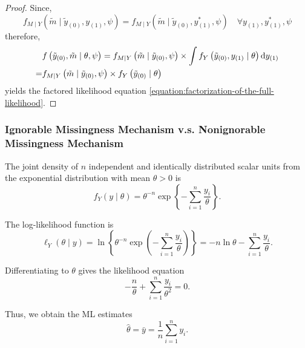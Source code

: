 \begin{proof}
	Since,
	\begin{equation}
		f_{M \mid Y}\left(\tilde{m} \mid \tilde{y}_{(0)}, y_{(1)}, \psi\right)=f_{M \mid Y}\left(\tilde{m} \mid \tilde{y}_{(0)}, y_{(1)}^{*}, \psi\right) \quad \forall y_{(1)}, y_{(1)}^{*}, \psi
	\end{equation}
	therefore,
	\begin{equation}
		\begin{aligned}
			  & f\left(\tilde{y}_{(0)}, \tilde{m} \mid \theta, \psi\right)=f_{M \mid Y}\left(\tilde{m} \mid \tilde{y}_{(0)}, \psi\right) \times \int f_{Y}\left(\tilde{y}_{(0)}, y_{(1)} \mid \theta\right) \mathop{}\!\mathrm{d} y_{(1)} \\
			= & f_{M \mid Y}\left(\tilde{m} \mid \tilde{y}_{(0)}, \psi\right) \times f_{Y}\left(\tilde{y}_{(0)} \mid \theta\right)
		\end{aligned}
	\end{equation}
	yields the factored likelihood equation \ref{equation:factorization-of-the-full-likelihood}.
\end{proof}

\subsubsection{Ignorable Missingness Mechanism v.s. Nonignorable Missingness Mechanism}

\begin{example}
	The joint density of $n$ independent and identically distributed scalar units from the exponential distribution with mean $\theta>0$ is
	\begin{equation}
		f_{Y}(y\mid\theta)=\theta^{-n}\exp\left\{-\sum_{i=1}^{n}\frac{y_{i}}{\theta}\right\}.
	\end{equation}

	The log-likelihood function is
	\begin{equation}
		\ell_{Y}(\theta\mid y)=\ln\left\{\theta^{-n}\exp\left(-\sum_{i=1}^{n}\frac{y_{i}}{\theta}\right)\right\}=-n\ln\theta-\sum_{i=1}^{n}\frac{y_{i}}{\theta}.
	\end{equation}

	Differentiating to $\theta$ gives the likelihood equation
	\begin{equation}
		-\frac{n}{\theta}+\sum_{i=1}^{n} \frac{y_{i}}{\theta^{2}}=0.
	\end{equation}

	Thus, we obtain the ML estimates
	\begin{equation}
		\hat{\theta}=\bar{y}=\frac{1}{n}\sum_{i=1}^{n}y_i.
	\end{equation}
\end{example}

